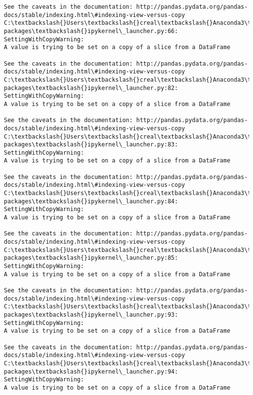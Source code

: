 \documentclass[11pt]{article}
\begin{document}
\begin{Verbatim}[commandchars=\\\{\}]
See the caveats in the documentation: http://pandas.pydata.org/pandas-docs/stable/indexing.html\#indexing-view-versus-copy
C:\textbackslash{}Users\textbackslash{}creal\textbackslash{}Anaconda3\textbackslash{}lib\textbackslash{}site-packages\textbackslash{}ipykernel\_launcher.py:66: SettingWithCopyWarning: 
A value is trying to be set on a copy of a slice from a DataFrame

See the caveats in the documentation: http://pandas.pydata.org/pandas-docs/stable/indexing.html\#indexing-view-versus-copy
C:\textbackslash{}Users\textbackslash{}creal\textbackslash{}Anaconda3\textbackslash{}lib\textbackslash{}site-packages\textbackslash{}ipykernel\_launcher.py:82: SettingWithCopyWarning: 
A value is trying to be set on a copy of a slice from a DataFrame

See the caveats in the documentation: http://pandas.pydata.org/pandas-docs/stable/indexing.html\#indexing-view-versus-copy
C:\textbackslash{}Users\textbackslash{}creal\textbackslash{}Anaconda3\textbackslash{}lib\textbackslash{}site-packages\textbackslash{}ipykernel\_launcher.py:83: SettingWithCopyWarning: 
A value is trying to be set on a copy of a slice from a DataFrame

See the caveats in the documentation: http://pandas.pydata.org/pandas-docs/stable/indexing.html\#indexing-view-versus-copy
C:\textbackslash{}Users\textbackslash{}creal\textbackslash{}Anaconda3\textbackslash{}lib\textbackslash{}site-packages\textbackslash{}ipykernel\_launcher.py:84: SettingWithCopyWarning: 
A value is trying to be set on a copy of a slice from a DataFrame

See the caveats in the documentation: http://pandas.pydata.org/pandas-docs/stable/indexing.html\#indexing-view-versus-copy
C:\textbackslash{}Users\textbackslash{}creal\textbackslash{}Anaconda3\textbackslash{}lib\textbackslash{}site-packages\textbackslash{}ipykernel\_launcher.py:85: SettingWithCopyWarning: 
A value is trying to be set on a copy of a slice from a DataFrame

See the caveats in the documentation: http://pandas.pydata.org/pandas-docs/stable/indexing.html\#indexing-view-versus-copy
C:\textbackslash{}Users\textbackslash{}creal\textbackslash{}Anaconda3\textbackslash{}lib\textbackslash{}site-packages\textbackslash{}ipykernel\_launcher.py:93: SettingWithCopyWarning: 
A value is trying to be set on a copy of a slice from a DataFrame

See the caveats in the documentation: http://pandas.pydata.org/pandas-docs/stable/indexing.html\#indexing-view-versus-copy
C:\textbackslash{}Users\textbackslash{}creal\textbackslash{}Anaconda3\textbackslash{}lib\textbackslash{}site-packages\textbackslash{}ipykernel\_launcher.py:94: SettingWithCopyWarning: 
A value is trying to be set on a copy of a slice from a DataFrame


\end{Verbatim}
\end{document}
